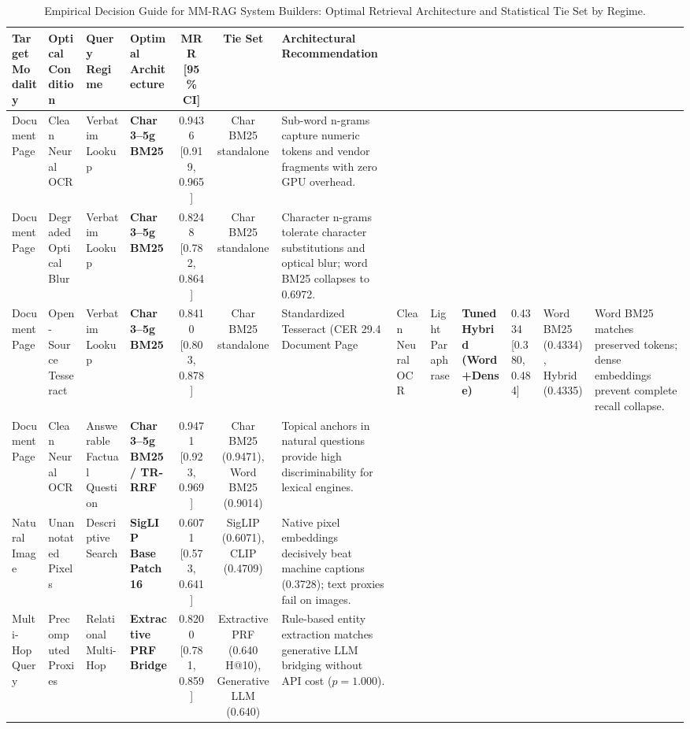 \begin{table}[t]
\centering\small
\caption{Empirical Decision Guide for MM-RAG System Builders: Optimal Retrieval Architecture and Statistical Tie Set by Regime.}\label{tab:decision_guide_v6}
\begin{tabular}{llllccl}
\toprule
Target Modality & Optical Condition & Query Regime & Optimal Architecture & MRR [95\% CI] & Tie Set & Architectural Recommendation \\
\midrule
Document Page & Clean Neural OCR & Verbatim Lookup & \textbf{Char 3--5g BM25} & 0.9436 [0.919, 0.965] & Char BM25 standalone & Sub-word n-grams capture numeric tokens and vendor fragments with zero GPU overhead. \\
Document Page & Degraded Optical Blur & Verbatim Lookup & \textbf{Char 3--5g BM25} & 0.8248 [0.782, 0.864] & Char BM25 standalone & Character n-grams tolerate character substitutions and optical blur; word BM25 collapses to 0.6972. \\
Document Page & Open-Source Tesseract & Verbatim Lookup & \textbf{Char 3--5g BM25} & 0.8410 [0.803, 0.878] & Char BM25 standalone & Standardized Tesseract (CER 29.4%
Document Page & Clean Neural OCR & Light Paraphrase & \textbf{Tuned Hybrid (Word+Dense)} & 0.4334 [0.380, 0.484] & Word BM25 (0.4334), Hybrid (0.4335) & Word BM25 matches preserved tokens; dense embeddings prevent complete recall collapse. \\
Document Page & Clean Neural OCR & Answerable Factual Question & \textbf{Char 3--5g BM25 / TR-RRF} & 0.9471 [0.923, 0.969] & Char BM25 (0.9471), Word BM25 (0.9014) & Topical anchors in natural questions provide high discriminability for lexical engines. \\
Natural Image & Unannotated Pixels & Descriptive Search & \textbf{SigLIP Base Patch16} & 0.6071 [0.573, 0.641] & SigLIP (0.6071), CLIP (0.4709) & Native pixel embeddings decisively beat machine captions (0.3728); text proxies fail on images. \\
Multi-Hop Query & Precomputed Proxies & Relational Multi-Hop & \textbf{Extractive PRF Bridge} & 0.8200 [0.781, 0.859] & Extractive PRF (0.640 H@10), Generative LLM (0.640) & Rule-based entity extraction matches generative LLM bridging without API cost ($p=1.000$). \\
\bottomrule
\end{tabular}
\end{table}
